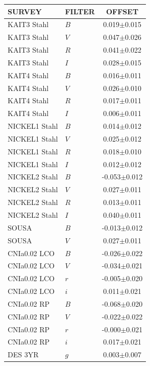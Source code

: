 {\begin{tabular}{llc}
\toprule
    SURVEY & FILTER &           OFFSET \\
\hline
     KAIT3 Stahl &      $B$ &   0.019$\pm$0.015 \\
     KAIT3 Stahl &      $V$ &   0.047$\pm$0.026 \\
     KAIT3 Stahl &      $R$ &   0.041$\pm$0.022 \\
     KAIT3 Stahl &      $I$ &   0.028$\pm$0.015 \\
     KAIT4 Stahl &      $B$ &   0.016$\pm$0.011 \\
     KAIT4 Stahl &      $V$ &   0.026$\pm$0.010 \\
     KAIT4 Stahl &      $R$ &   0.017$\pm$0.011 \\
     KAIT4 Stahl &      $I$ &   0.006$\pm$0.011 \\
   NICKEL1 Stahl &      $B$ &   0.014$\pm$0.012 \\
   NICKEL1 Stahl &      $V$ &   0.025$\pm$0.012 \\
   NICKEL1 Stahl &      $R$ &   0.018$\pm$0.010 \\
   NICKEL1 Stahl &      $I$ &   0.012$\pm$0.012 \\
   NICKEL2 Stahl &      $B$ &  -0.053$\pm$0.012 \\
   NICKEL2 Stahl &      $V$ &   0.027$\pm$0.011 \\
   NICKEL2 Stahl &      $R$ &   0.013$\pm$0.011 \\
   NICKEL2 Stahl &      $I$ &    0.040$\pm$0.011 \\
           SOUSA &      $B$ &  -0.013$\pm$0.012 \\
           SOUSA &      $V$ &   0.027$\pm$0.011 \\
        CNIa0.02 LCO &      $B$ &  -0.026$\pm$0.022 \\
        CNIa0.02 LCO&      $V$ &  -0.034$\pm$0.021 \\
        CNIa0.02 LCO&      $r$ &   -0.005$\pm$0.020 \\
        CNIa0.02 LCO&      $i$ &   0.011$\pm$0.021 \\
        CNIa0.02 RP&    $B$ &  -0.068$\pm$0.020 \\
        CNIa0.02 RP&      $V$ &  -0.022$\pm$0.022 \\
        CNIa0.02 RP&      $r$ &  -0.000$\pm$0.021 \\
        CNIa0.02 RP&      $i$ &   0.017$\pm$0.021 \\
         DES 3YR &      $g$ &   0.003$\pm$0.007 \\

\end{tabular}}
